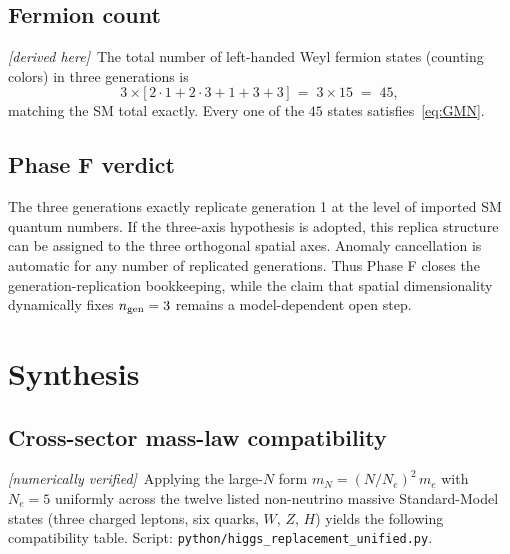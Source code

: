 \documentclass[11pt]{article}
\newcommand{\derived}{\textit{[derived here]}}
\newcommand{\numerical}{\textit{[numerically verified]}}
\begin{document}
\subsection{Fermion count}

\derived\ The total number of left-handed Weyl fermion states
(counting colors) in three generations is
\begin{equation}
  3\times\bigl[\,2\cdot 1 + 2\cdot 3 + 1 + 3 + 3\,\bigr]
  \;=\; 3\times 15 \;=\; 45,
\end{equation}
matching the SM total exactly. Every one of the $45$ states
satisfies~\eqref{eq:GMN}.

\subsection{Phase F verdict}

The three generations exactly replicate generation 1 at the
level of imported SM quantum numbers. If the three-axis
hypothesis is adopted, this replica structure can be assigned
to the three orthogonal spatial axes. Anomaly cancellation is
automatic for any number of replicated generations. Thus Phase
F closes the generation-replication bookkeeping, while the
claim that spatial dimensionality dynamically fixes
$n_{\rm gen}=3$ remains a model-dependent open step.

\section{Synthesis}
\label{sec:synthesis}

\subsection{Cross-sector mass-law compatibility}
\label{sec:unified}

\numerical\ Applying the large-$N$ form
$m_N=(N/N_e)^{2}\,m_e$ with $N_e=5$ uniformly across the twelve
listed non-neutrino massive Standard-Model states (three
charged leptons, six quarks, $W$, $Z$, $H$) yields the
following compatibility table.
Script: \texttt{python/higgs\_replacement\_unified.py}.
\end{document}
